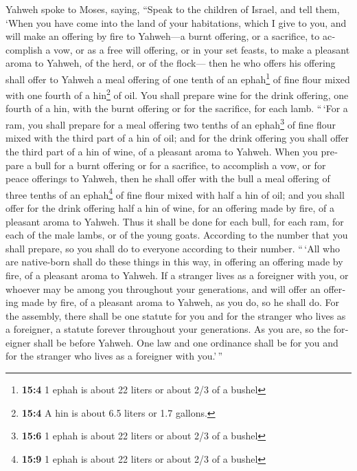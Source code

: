 \begin{paracol}{2}
\begin{otherlanguage}{english}
 Yahweh spoke to Moses, saying,  ``Speak to
the children of Israel, and tell them, `When you have come into the land
of your habitations, which I give to you,  and will make
an offering by fire to Yahweh---a burnt offering, or a sacrifice, to
accomplish a vow, or as a free will offering, or in your set feasts, to
make a pleasant aroma to Yahweh, of the herd, or of the flock---
 then he who offers his offering shall offer to Yahweh a
meal offering of one tenth of an ephah\footnote{\textbf{15:4} 1 ephah is
  about 22 liters or about 2/3 of a bushel} of fine flour mixed with one
fourth of a hin\footnote{\textbf{15:4} A hin is about 6.5 liters or 1.7
  gallons.} of oil.  You shall prepare wine for the drink
offering, one fourth of a hin, with the burnt offering or for the
sacrifice, for each lamb.  ``\,`For a ram, you shall
prepare for a meal offering two tenths of an ephah\footnote{\textbf{15:6}
  1 ephah is about 22 liters or about 2/3 of a bushel} of fine flour
mixed with the third part of a hin of oil;  and for the
drink offering you shall offer the third part of a hin of wine, of a
pleasant aroma to Yahweh.  When you prepare a bull for a
burnt offering or for a sacrifice, to accomplish a vow, or for peace
offerings to Yahweh,  then he shall offer with the bull a
meal offering of three tenths of an ephah\footnote{\textbf{15:9} 1 ephah
  is about 22 liters or about 2/3 of a bushel} of fine flour mixed with
half a hin of oil;  and you shall offer for the drink
offering half a hin of wine, for an offering made by fire, of a pleasant
aroma to Yahweh.  Thus it shall be done for each bull,
for each ram, for each of the male lambs, or of the young goats.
 According to the number that you shall prepare, so you
shall do to everyone according to their number.  ``\,`All
who are native-born shall do these things in this way, in offering an
offering made by fire, of a pleasant aroma to Yahweh.  If
a stranger lives as a foreigner with you, or whoever may be among you
throughout your generations, and will offer an offering made by fire, of
a pleasant aroma to Yahweh, as you do, so he shall do. 
For the assembly, there shall be one statute for you and for the
stranger who lives as a foreigner, a statute forever throughout your
generations. As you are, so the foreigner shall be before Yahweh.
 One law and one ordinance shall be for you and for the
stranger who lives as a foreigner with you.'\,''


\end{otherlanguage}
\end{paracol}
